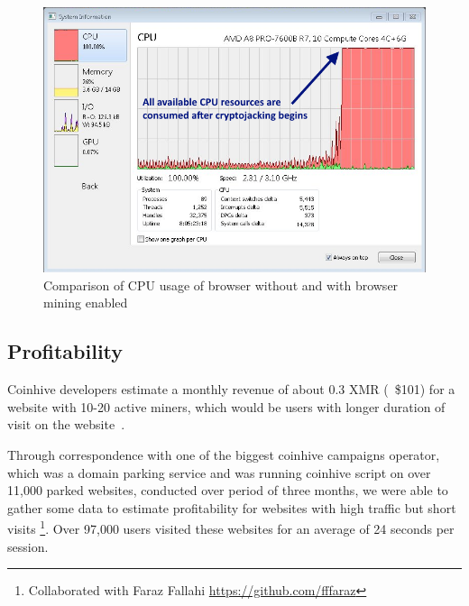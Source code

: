 \begin{figure}[t]
\centering
\includegraphics[width=\linewidth]{figures/windows_cpu_usage.png}
	\caption{Comparison of CPU usage of browser without and with browser mining enabled}
\end{figure}

\subsection{Profitability}
\label{profitabilitexperiment}

Coinhive developers estimate a monthly revenue of about 0.3 XMR (~\$101) for a website with 10-20 active miners, which would be users with longer duration of visit on the website~\cite{coinhive}.

Through correspondence with one of the biggest coinhive campaigns operator, which was a domain parking service and was running coinhive script on over 11,000 parked websites, conducted over period of three months, we were able to gather some data to estimate profitability for websites with high traffic but short visits \footnote{Collaborated with Faraz Fallahi \url{https://github.com/fffaraz}}. Over 97,000 users visited these websites for an average of 24 seconds per session.


